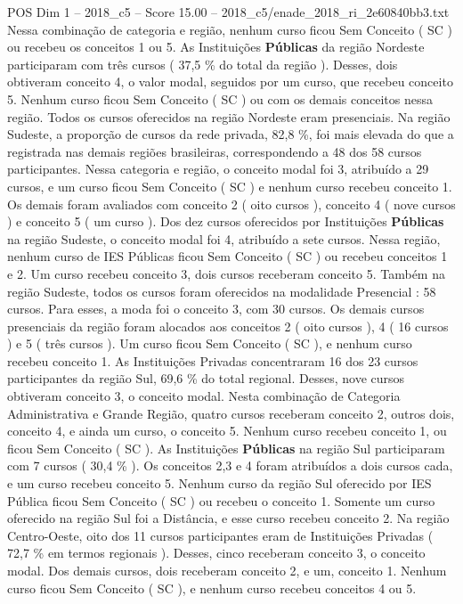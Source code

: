 \begin{textsample}{POS Dim 1 – 2018\_c5 – Score 15.00 – 2018\_c5/enade\_2018\_ri\_2e60840bb3.txt}
Nessa combinação de categoria e região, nenhum curso ficou Sem Conceito ( SC ) ou recebeu os conceitos 1 ou 5.
As Instituições \textbf{Públicas} da região Nordeste participaram com três cursos ( 37,5 \% do total da região ).
Desses, dois obtiveram conceito 4, o valor modal, seguidos por um curso, que recebeu conceito 5.
Nenhum curso ficou Sem Conceito ( SC ) ou com os demais conceitos nessa região.
Todos os cursos oferecidos na região Nordeste eram presenciais.
Na região Sudeste, a proporção de cursos da rede privada, 82,8 \%, foi mais elevada do que a registrada nas demais regiões brasileiras, correspondendo a 48 dos 58 cursos participantes.
Nessa categoria e região, o conceito modal foi 3, atribuído a 29 cursos, e um curso ficou Sem Conceito ( SC ) e nenhum curso recebeu conceito 1.
Os demais foram avaliados com conceito 2 ( oito cursos ), conceito 4 ( nove cursos ) e conceito 5 ( um curso ).
Dos dez cursos oferecidos por Instituições \textbf{Públicas} na região Sudeste, o conceito modal foi 4, atribuído a sete cursos.
Nessa região, nenhum curso de IES Públicas ficou Sem Conceito ( SC ) ou recebeu conceitos 1 e 2.
Um curso recebeu conceito 3, dois cursos receberam conceito 5.
Também na região Sudeste, todos os cursos foram oferecidos na modalidade Presencial : 58 cursos.
Para esses, a moda foi o conceito 3, com 30 cursos.
Os demais cursos presenciais da região foram alocados aos conceitos 2 ( oito cursos ), 4 ( 16 cursos ) e 5 ( três cursos ).
Um curso ficou Sem Conceito ( SC ), e nenhum curso recebeu conceito 1.
As Instituições Privadas concentraram 16 dos 23 cursos participantes da região Sul, 69,6 \% do total regional.
Desses, nove cursos obtiveram conceito 3, o conceito modal.
Nesta combinação de Categoria Administrativa e Grande Região, quatro cursos receberam conceito 2, outros dois, conceito 4, e ainda um curso, o conceito 5.
Nenhum curso recebeu conceito 1, ou ficou Sem Conceito ( SC ).
As Instituições \textbf{Públicas} na região Sul participaram com 7 cursos ( 30,4 \% ).
Os conceitos 2,3 e 4 foram atribuídos a dois cursos cada, e um curso recebeu conceito 5.
Nenhum curso da região Sul oferecido por IES Pública ficou Sem Conceito ( SC ) ou recebeu o conceito 1.
Somente um curso oferecido na região Sul foi a Distância, e esse curso recebeu conceito 2.
Na região Centro-Oeste, oito dos 11 cursos participantes eram de Instituições Privadas ( 72,7 \% em termos regionais ).
Desses, cinco receberam conceito 3, o conceito modal.
Dos demais cursos, dois receberam conceito 2, e um, conceito 1.
Nenhum curso ficou Sem Conceito ( SC ), e nenhum curso recebeu conceitos 4 ou 5.

\end{textsample}

